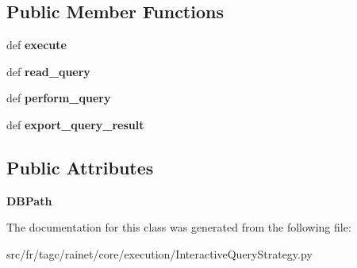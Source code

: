 \subsection*{Public Member Functions}
\begin{DoxyCompactItemize}
\item 
\hypertarget{classsrc_1_1fr_1_1tagc_1_1rainet_1_1core_1_1execution_1_1InteractiveQueryStrategy_1_1InteractiveQueryStrategy_a73f1b99c14678d69dd25f928847713f8}{def {\bfseries execute}}\label{classsrc_1_1fr_1_1tagc_1_1rainet_1_1core_1_1execution_1_1InteractiveQueryStrategy_1_1InteractiveQueryStrategy_a73f1b99c14678d69dd25f928847713f8}

\item 
\hypertarget{classsrc_1_1fr_1_1tagc_1_1rainet_1_1core_1_1execution_1_1InteractiveQueryStrategy_1_1InteractiveQueryStrategy_ab2280873902881360927f2a66d81e8ce}{def {\bfseries read\-\_\-query}}\label{classsrc_1_1fr_1_1tagc_1_1rainet_1_1core_1_1execution_1_1InteractiveQueryStrategy_1_1InteractiveQueryStrategy_ab2280873902881360927f2a66d81e8ce}

\item 
\hypertarget{classsrc_1_1fr_1_1tagc_1_1rainet_1_1core_1_1execution_1_1InteractiveQueryStrategy_1_1InteractiveQueryStrategy_af4c5794a2795aa7dc70f87d51e303404}{def {\bfseries perform\-\_\-query}}\label{classsrc_1_1fr_1_1tagc_1_1rainet_1_1core_1_1execution_1_1InteractiveQueryStrategy_1_1InteractiveQueryStrategy_af4c5794a2795aa7dc70f87d51e303404}

\item 
\hypertarget{classsrc_1_1fr_1_1tagc_1_1rainet_1_1core_1_1execution_1_1InteractiveQueryStrategy_1_1InteractiveQueryStrategy_aaf4fa0321ef28d630612f5008466fa1e}{def {\bfseries export\-\_\-query\-\_\-result}}\label{classsrc_1_1fr_1_1tagc_1_1rainet_1_1core_1_1execution_1_1InteractiveQueryStrategy_1_1InteractiveQueryStrategy_aaf4fa0321ef28d630612f5008466fa1e}

\end{DoxyCompactItemize}
\subsection*{Public Attributes}
\begin{DoxyCompactItemize}
\item 
\hypertarget{classsrc_1_1fr_1_1tagc_1_1rainet_1_1core_1_1execution_1_1InteractiveQueryStrategy_1_1InteractiveQueryStrategy_a7e0668a24218ccbb4812c629aa382516}{{\bfseries D\-B\-Path}}\label{classsrc_1_1fr_1_1tagc_1_1rainet_1_1core_1_1execution_1_1InteractiveQueryStrategy_1_1InteractiveQueryStrategy_a7e0668a24218ccbb4812c629aa382516}

\end{DoxyCompactItemize}


The documentation for this class was generated from the following file\-:\begin{DoxyCompactItemize}
\item 
src/fr/tagc/rainet/core/execution/Interactive\-Query\-Strategy.\-py\end{DoxyCompactItemize}

